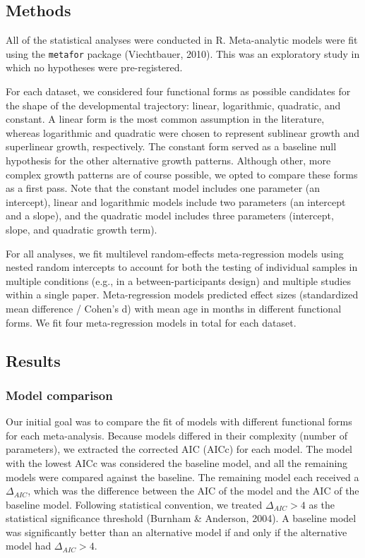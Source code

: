 \documentclass[
  man]{apa6}
\begin{document}
\hypertarget{methods}{%
\subsection{Methods}\label{methods}}

All of the statistical analyses were conducted in R. Meta-analytic models were fit using the \texttt{metafor} package (Viechtbauer, 2010). This was an exploratory study in which no hypotheses were pre-registered.

For each dataset, we considered four functional forms as possible candidates for the shape of the developmental trajectory: linear, logarithmic, quadratic, and constant. A linear form is the most common assumption in the literature, whereas logarithmic and quadratic were chosen to represent sublinear growth and superlinear growth, respectively. The constant form served as a baseline null hypothesis for the other alternative growth patterns. Although other, more complex growth patterns are of course possible, we opted to compare these forms as a first pass. Note that the constant model includes one parameter (an intercept), linear and logarithmic models include two parameters (an intercept and a slope), and the quadratic model includes three parameters (intercept, slope, and quadratic growth term).

For all analyses, we fit multilevel random-effects meta-regression models using nested random intercepts to account for both the testing of individual samples in multiple conditions (e.g., in a between-participants design) and multiple studies within a single paper. Meta-regression models predicted effect sizes (standardized mean difference / Cohen's d) with mean age in months in different functional forms. We fit four meta-regression models in total for each dataset.

\hypertarget{results}{%
\subsection{Results}\label{results}}

\hypertarget{model-comparison}{%
\subsubsection{Model comparison}\label{model-comparison}}

Our initial goal was to compare the fit of models with different functional forms for each meta-analysis. Because models differed in their complexity (number of parameters), we extracted the corrected AIC (AICc) for each model. The model with the lowest AICc was considered the baseline model, and all the remaining models were compared against the baseline. The remaining model each received a \(\Delta_{AIC}\), which was the difference between the AIC of the model and the AIC of the baseline model. Following statistical convention, we treated \(\Delta_{AIC} > 4\) as the statistical significance threshold (Burnham \& Anderson, 2004). A baseline model was significantly better than an alternative model if and only if the alternative model had \(\Delta_{AIC} > 4\).
\end{document}
